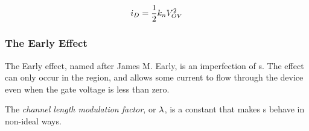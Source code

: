 \begin{equation}\label{eq:MOSFET_Saturation_Region-Current}
  i_{D} = \frac{1}{2} k_{n} V_{OV}^{2}
\end{equation}

\subsubsection{The Early Effect}\label{subsubsec:MOSFET-Early_Effect}
The Early effect, named after James M. Early, is an imperfection of s.
The effect can only occur in the  region, and allows some current to flow through the device even when the gate voltage is less than zero.

\begin{definition}\label{def:MOSFET-Channel_Length_Modulation_Factor}
  The \emph{channel length modulation factor}, or $\lambda$, is a constant that makes s behave in non-ideal ways.
\end{definition}


